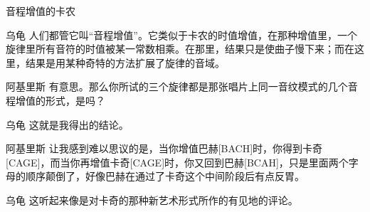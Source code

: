 \begin{dialog}{音程增值的卡农}
\begin{dialogue}
\item[乌龟]人们都管它叫“音程增值”。它类似于卡农的时值增值，在那种增值里，一个旋律里所有音符的时值被某一常数相乘。在那里，结果只是使曲子慢下来；而在这里，结果是用某种奇特的方法扩展了旋律的音域。

\item[阿基里斯]有意思。那么你所试的三个旋律都是那张唱片上同一音纹模式的几个音程增值的形式，是吗？

\item[乌龟]这就是我得出的结论。

\item[阿基里斯]让我感到难以思议的是，当你增值巴赫[BACH]时，你得到卡奇[CAGE]，而当你再增值卡奇[CAGE]时，你又回到巴赫[BCAH]，只是里面两个字母的顺序颠倒了，好像巴赫在通过了卡奇这个中间阶段后有点反胃。
\item[乌龟]这听起来像是对卡奇的那种新艺术形式所作的有见地的评论。

\end{dialogue}

\end{dialog}
